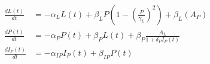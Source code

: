 

\begin{eqnarray*}
  \frac{dL(t)}{dt} &= -\alpha_{L}L(t) + \beta_{L}P\left(1-\left(\frac{P}{\gamma_{L}}\right)^{2}\right) + \beta_{L}(A_{P}) \\
  \frac{dP(t)}{dt} &= -\alpha_{P}P(t) + \beta_{P}L(t) + \beta_{P}\frac{A_{L}}{1+\delta_{P}I_{P}(t)} \\
  \frac{dI_{P}(t)}{dt} &= -\alpha_{IP}I_{P}(t) + \beta_{IP}P(t)
\end{eqnarray*}
